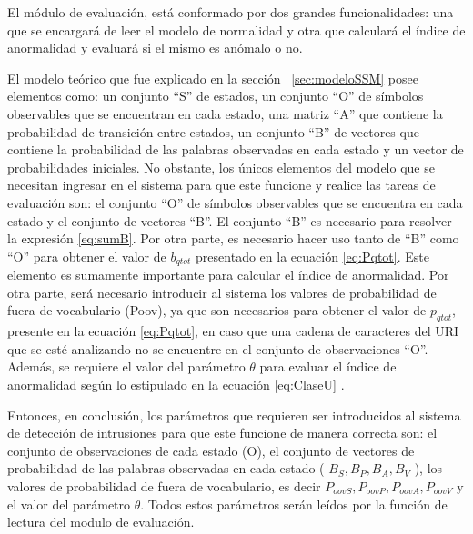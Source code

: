 El módulo de evaluación, está conformado por dos grandes funcionalidades: una que se encargará de leer el modelo de normalidad y  otra que calculará el índice de anormalidad y evaluará si el mismo es anómalo o no. 

El modelo teórico que fue explicado en la sección ~\ref{sec:modeloSSM} posee elementos como: un conjunto ``S'' de estados, un conjunto ``O'' de símbolos observables que se encuentran en cada estado, una matriz ``A'' que contiene la probabilidad de transición entre estados, un conjunto ``B'' de vectores que contiene la probabilidad de las palabras observadas en cada estado y un vector de probabilidades iniciales. No obstante, los únicos elementos del modelo que se necesitan ingresar en el sistema para que este funcione y realice las tareas de evaluación son: el conjunto ``O'' de símbolos observables que se encuentra en cada estado y el conjunto de vectores ``B''. El conjunto ``B'' es necesario para resolver la expresión \ref{eq:sumB}. Por otra parte, es necesario hacer uso tanto de ``B'' como ``O'' para obtener el valor de $b_{qtot}$ presentado en la ecuación \ref{eq:Pqtot}. Este elemento es sumamente importante para calcular el índice de anormalidad. Por otra parte, será necesario introducir al sistema los valores de probabilidad de fuera de vocabulario (Poov), ya que son necesarios para obtener el valor de $p_{qtot}$, presente en la ecuación \ref{eq:Pqtot}, en caso que una cadena de caracteres del URI que se esté analizando no se encuentre en el conjunto de observaciones ``O''. Además, se requiere el valor del parámetro $\theta$ para evaluar el índice de anormalidad según lo estipulado en la ecuación \ref{eq:ClaseU} .

    Entonces, en conclusión, los parámetros que requieren ser introducidos al sistema de detección de intrusiones para que este funcione de manera correcta son: el conjunto de observaciones de cada estado (O), el conjunto de vectores de probabilidad de las palabras observadas en cada estado ( $B_{S}, B_{P}, B_{A}, B_{V}$ ), los valores de probabilidad de fuera de vocabulario, es decir $P_{oovS}, P_{oovP}, P_{oovA}, P_{oovV}$ y el valor del parámetro $\theta$. Todos estos parámetros serán leídos por la función de lectura del modulo de evaluación.
    
